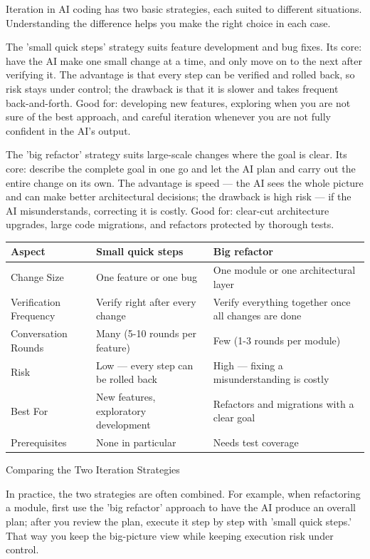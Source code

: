 
Iteration in AI coding has two basic strategies, each suited to different situations. Understanding the difference helps you make the right choice in each case.

The 'small quick steps' strategy suits feature development and bug fixes. Its core: have the AI make one small change at a time, and only move on to the next after verifying it. The advantage is that every step can be verified and rolled back, so risk stays under control; the drawback is that it is slower and takes frequent back-and-forth. Good for: developing new features, exploring when you are not sure of the best approach, and careful iteration whenever you are not fully confident in the AI's output.

The 'big refactor' strategy suits large-scale changes where the goal is clear. Its core: describe the complete goal in one go and let the AI plan and carry out the entire change on its own. The advantage is speed — the AI sees the whole picture and can make better architectural decisions; the drawback is high risk — if the AI misunderstands, correcting it is costly. Good for: clear-cut architecture upgrades, large code migrations, and refactors protected by thorough tests.

\begin{center}
\begin{tabularx}{\linewidth}{|X|X|X|}
\hline
\textbf{Aspect} & \textbf{Small quick steps} & \textbf{Big refactor} \tabularnewline
\hline
Change Size & One feature or one bug & One module or one architectural layer \tabularnewline
Verification Frequency & Verify right after every change & Verify everything together once all changes are done \tabularnewline
Conversation Rounds & Many (5-10 rounds per feature) & Few (1-3 rounds per module) \tabularnewline
Risk & Low — every step can be rolled back & High — fixing a misunderstanding is costly \tabularnewline
Best For & New features, exploratory development & Refactors and migrations with a clear goal \tabularnewline
Prerequisites & None in particular & Needs test coverage \tabularnewline
\hline
\end{tabularx}
\end{center}

\begin{center}\small\color{gray}Comparing the Two Iteration Strategies\end{center}

In practice, the two strategies are often combined. For example, when refactoring a module, first use the 'big refactor' approach to have the AI produce an overall plan; after you review the plan, execute it step by step with 'small quick steps.' That way you keep the big-picture view while keeping execution risk under control.

